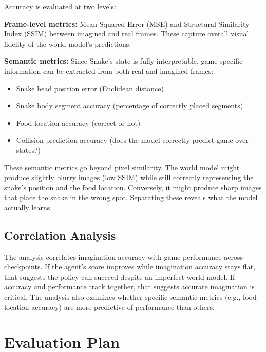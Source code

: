 \documentclass[letterpaper]{article}
\begin{document}
Accuracy is evaluated at two levels:

\textbf{Frame-level metrics:} Mean Squared Error (MSE) and Structural Similarity Index (SSIM) between imagined and real frames. These capture overall visual fidelity of the world model's predictions.

\textbf{Semantic metrics:} Since Snake's state is fully interpretable, game-specific information can be extracted from both real and imagined frames:
\begin{itemize}
    \item Snake head position error (Euclidean distance)
    \item Snake body segment accuracy (percentage of correctly placed segments)
    \item Food location accuracy (correct or not)
    \item Collision prediction accuracy (does the model correctly predict game-over states?)
\end{itemize}

These semantic metrics go beyond pixel similarity. The world model might produce slightly blurry images (low SSIM) while still correctly representing the snake's position and the food location. Conversely, it might produce sharp images that place the snake in the wrong spot. Separating these reveals what the model actually learns.

\subsection{Correlation Analysis}

The analysis correlates imagination accuracy with game performance across checkpoints. If the agent's score improves while imagination accuracy stays flat, that suggests the policy can succeed despite an imperfect world model. If accuracy and performance track together, that suggests accurate imagination is critical. The analysis also examines whether specific semantic metrics (e.g., food location accuracy) are more predictive of performance than others.

\section{Evaluation Plan}
\end{document}
